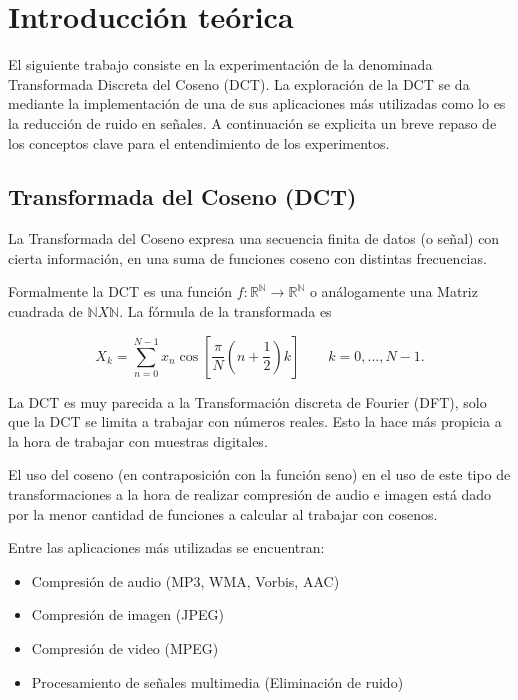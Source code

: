 \section{Introducci\'on te\'orica}

El siguiente trabajo consiste en la experimentaci\'on de la denominada 
Transformada Discreta del Coseno (DCT). La exploraci\'on de la DCT se da
mediante la implementaci\'on de una de sus aplicaciones m\'as utilizadas como lo
es la reducci\'on de ruido en se\~nales. A continuaci\'on se explicita
un breve repaso de los conceptos clave para el entendimiento de los
experimentos.

\subsection{Transformada del Coseno (DCT)}

La Transformada del Coseno expresa una secuencia finita de datos (o se\~nal) 
con cierta informaci\'on, en una suma de funciones coseno con distintas 
frecuencias.

Formalmente la DCT es una funci\'on $f:\mathbb{R}^\mathbb{N} \to \mathbb{R}^
\mathbb{N}$ o an\'alogamente una
Matriz cuadrada de $\mathbb{N} X \mathbb{N}$. La f\'ormula de la transformada es

$$X_k = \sum_{n=0}^{N-1} x_n \cos \left[\frac{\pi}{N} \left(n+\frac{1}{2}\right) 
k \right] \quad \quad k = 0, \dots, N-1.$$ 

La DCT es muy parecida a la Transformaci\'on discreta de Fourier (DFT), solo que
la DCT se limita a trabajar con n\'umeros reales. Esto la hace m\'as propicia a
la hora de trabajar con muestras digitales.

El uso del coseno (en contraposici\'on con la funci\'on seno) en el uso de este
tipo de transformaciones a la hora de realizar compresi\'on de audio e imagen
est\'a dado por la menor cantidad de funciones a calcular al trabajar con
cosenos.

Entre las aplicaciones m\'as utilizadas se encuentran:

\begin{itemize}
\item Compresi\'on de audio (MP3, WMA, Vorbis, AAC)
\item Compresi\'on de imagen (JPEG)
\item Compresi\'on de video (MPEG)
\item Procesamiento de se\~nales multimedia (Eliminaci\'on de ruido)
\end{itemize}

